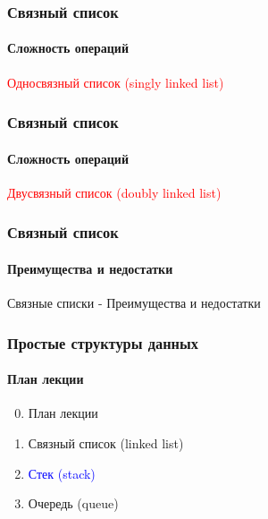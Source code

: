 \documentclass[aspectratio=169]{beamer}
\begin{document}
\begin{frame}
\frametitle{Связный список}
\framesubtitle{Сложность операций}
\justifying
\textcolor{red}{Односвязный список (singly linked list)}
\begin{figure}
    \captionsetup[subfigure]{labelformat=empty}
    \centering
\end{figure}
\end{frame}

\begin{frame}
\frametitle{Связный список}
\framesubtitle{Сложность операций}
\justifying
\textcolor{red}{Двусвязный список (doubly linked list)}
\begin{figure}
    \captionsetup[subfigure]{labelformat=empty}
    \centering
\end{figure}
\end{frame}

\begin{frame}
\frametitle{Связный список}
\framesubtitle{Преимущества и недостатки}
\justifying
Связные списки - Преимущества и недостатки
\begin{figure}
    \captionsetup[subfigure]{labelformat=empty}
    \centering
\end{figure}
\end{frame}


\begin{frame}
\frametitle{Простые структуры данных}
\framesubtitle{План лекции}

\begin{enumerate}
  \setcounter{enumi}{-1}
  \item{План лекции}
  \item{Связный список (linked list)}
  \item{\textcolor{blue}{Стек (stack)}}
  \item{Очередь (queue)}
\end{enumerate}
\end{frame}
\end{document}
